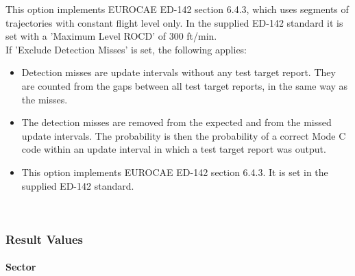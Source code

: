 This option implements EUROCAE ED-142 section 6.4.3, which uses segments of trajectories with constant flight level only. In the supplied ED-142 standard it is set with a 'Maximum Level ROCD' of 300 ft/min. \\

If 'Exclude Detection Misses' is set, the following applies:
\begin{itemize}
    \item Detection misses are update intervals without any test target report. They are counted from the gaps between all test target reports, in the same way as the misses.
    \item The detection misses are removed from the expected and from the missed update intervals. The probability is then the probability of a correct Mode C code within an update interval in which a test target report was output.
    \item This option implements EUROCAE ED-142 section 6.4.3. It is set in the supplied ED-142 standard.
\end{itemize}
\ \\

\subsubsection{Result Values}

\paragraph{Sector}

